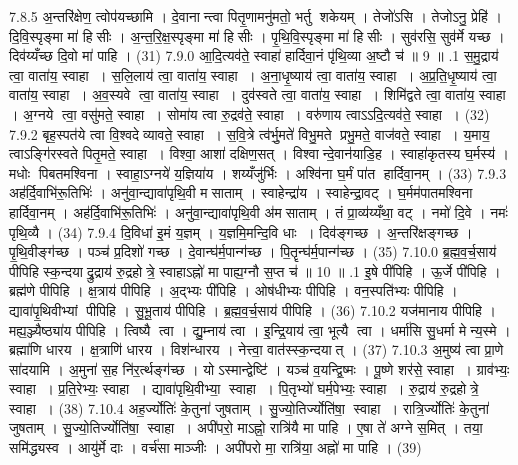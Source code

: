 7.8.5
अ॒न्तरि॑क्षेण॒ त्वोप॑यच्छामि । दे॒वानान्त्वा पितृ॒णामनु॑मतो॒ भर्तु शकेयम् । तेजो॑ऽसि । तेजोऽनु॒ प्रेहि॑ । दि॒वि॒स्पृङ्मा मा॑ हिसीः । अ॒न्त॒रि॒क्ष॒स्पृङ्मा मा॑ हिसीः । पृ॒थि॒वि॒स्पृङ्मा मा॑ हिसीः । सुव॑रसि॒ सुव॑र्मे यच्छ । दिव॑य्यँच्छ दि॒वो मा॑ पाहि । (31)
7.9.0
आ॒दि॒त्यव॑ते॒ स्वाहा॑ हार्दिवा॒नं पृ॑थि॒व्या अ॒ष्टौ च॑ ॥ 9 ॥
.1
स॒मु॒द्राय॑ त्वा॒ वाता॑य॒ स्वाहा । स॒लि॒लाय॑ त्वा॒ वाता॑य॒ स्वाहा । अ॒ना॒धृ॒ष्याय॑ त्वा॒ वाता॑य॒ स्वाहा । अ॒प्र॒ति॒धृ॒ष्याय॑ त्वा॒ वाता॑य॒ स्वाहा । अ॒व॒स्यवे त्वा॒ वाता॑य॒ स्वाहा । दुव॑स्वते त्वा॒ वाता॑य॒ स्वाहा । शिमि॑द्वते त्वा॒ वाता॑य॒ स्वाहा । अ॒ग्नये त्वा॒ वसु॑मते॒ स्वाहा । सोमा॑य त्वा रु॒द्रव॑ते॒ स्वाहा । वरु॑णाय त्वाऽऽदि॒त्यव॑ते॒ स्वाहा । (32)
7.9.2
बृह॒स्पत॑ये त्वा वि॒श्वदेव्यावते॒ स्वाहा । स॒वि॒त्रे त्व॑र्भु॒मते॑ विभु॒मते प्रभु॒मते॒ वाज॑वते॒ स्वाहा । य॒माय॒ त्वाऽङ्गि॑रस्वते पितृ॒मते॒ स्वाहा । विश्वा॒ आशा॑ दक्षिण॒सत् । विश्वान्दे॒वान॑याडि॒ह । स्वाहा॑कृतस्य घ॒र्मस्य॑ । मधोः पिबतमश्विना । स्वाहा॒ऽग्नये॑ य॒ज्ञिया॑य । शय्यँजु॑र्भिः । अश्वि॑ना घ॒र्मं पा॑त हार्दिवा॒नम् । (33)
7.9.3
अह॑र्दि॒वाभि॑रू॒तिभिः॑ । अनु॑वा॒न्द्यावा॑पृथि॒वी मसाताम् । स्वाहेन्द्रा॑य । स्वाहेन्द्रा॒वट् । घ॒र्मम॑पातमश्विना हार्दिवा॒नम् । अह॑र्दि॒वाभि॑रू॒तिभिः॑ । अनु॑वा॒न्द्यावा॑पृथि॒वी अ॑मसाताम् । तं प्रा॒व्य॑य्यँथा॒ वट् । नमो॑ दि॒वे । नमः॑ पृथि॒व्यै । (34)
7.9.4
दि॒विधा॑ इ॒मं य॒ज्ञम् । य॒ज्ञमि॒मन्दि॒वि धाः । दिव॑ङ्गच्छ । अ॒न्तरि॑क्षङ्गच्छ । पृ॒थि॒वीङ्ग॑च्छ । पञ्च॑ प्र॒दिशो॑ गच्छ । दे॒वान्घ॑र्म॒पान्ग॑च्छ । पि॒तॄन्घ॑र्म॒पान्ग॑च्छ । (35)
7.10.0
ब्र॒ह्म॒व॒र्च॒साय॑ पीपिहि स्क॒न्दयाद्रु॒द्राय॑ रु॒द्रहोत्रे॒ स्वाहाऽह्नो॑ मा पाह्य॒ग्नौ स॒प्त च॑ ॥ 10 ॥
.1
इ॒षे पी॑पिहि । ऊ॒र्जे पी॑पिहि । ब्रह्म॑णे पीपिहि । क्ष॒त्राय॑ पीपिहि । अ॒द्भ्यः पी॑पिहि । ओष॑धीभ्यः पीपिहि । वन॒स्पति॑भ्यः पीपिहि । द्यावा॑पृ॒थिवीभ्यां पीपिहि । सु॒भू॒ताय॑ पीपिहि । ब्र॒ह्म॒व॒र्च॒साय॑ पीपिहि । (36)
7.10.2
यज॑मानाय पीपिहि । मह्य॒ञ्ज्यैष्ठ्या॑य पीपिहि । त्विष्यै त्वा । द्यु॒म्नाय॑ त्वा । इ॒न्द्रि॒याय॑ त्वा॒ भूत्यै त्वा । धर्मा॑सि सु॒धर्मा मेन्य॒स्मे । ब्रह्मा॑णि धारय । क्ष॒त्राणि॑ धारय । विश॑न्धारय । नेत्त्वा॒ वात॑स्स्क॒न्दयात् । (37)
7.10.3
अ॒मुष्य॑ त्वा प्रा॒णे सा॑दयामि । अ॒मुना॑ स॒ह नि॑र॒र्त्थङ्ग॑च्छ । योऽस्मान्द्वेष्टि॑ । यञ्च॑ व॒यन्द्वि॒ष्मः । पू॒ष्णे शर॑से॒ स्वाहा । ग्राव॑भ्यः॒ स्वाहा । प्र॒ति॒रेभ्यः॒ स्वाहा । द्यावा॑पृथि॒वीभ्या॒ स्वाहा । पि॒तृभ्यो॑ घर्म॒पेभ्यः॒ स्वाहा । रु॒द्राय॑ रु॒द्रहोत्रे॒ स्वाहा । (38)
7.10.4
अह॒र्ज्योतिः॑ के॒तुना॑ जुषताम् । सु॒ज्यो॒तिर्ज्योति॑षा॒ स्वाहा । रात्रि॒र्ज्योतिः॑ के॒तुना॑ जुषताम् । सु॒ज्यो॒तिर्ज्योति॑षा॒ स्वाहा । अपी॑परो॒ माऽह्नो॒ रात्रि॑यै मा पाहि । ए॒षा ते॑ अग्ने स॒मित् । तया॒ समि॑द्ध्यस्व । आयु॑र्मे दाः । वर्च॑सा माञ्जीः । अपी॑परो मा॒ रात्रि॑या॒ अह्नो॑ मा पाहि । (39)
